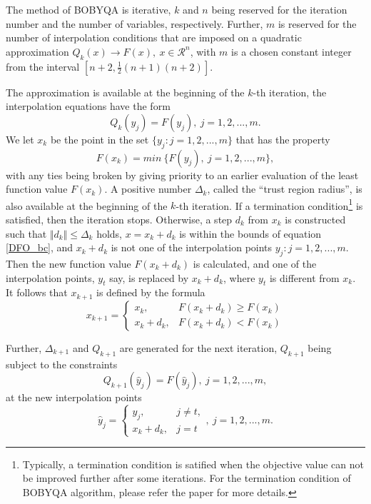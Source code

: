 \documentclass  [
  paper    = a4,
  BCOR     = 10mm,
  twoside,
  fontsize = 12pt,
  fleqn,
  toc      = bibnumbered,
  toc      = listofnumbered,
  numbers  = noendperiod,
  headings = normal,
  listof   = leveldown,
  version  = 3.03
]                                       {scrreprt}
\newcommand{\<}{\langle}
\renewcommand{\>}{\rangle}
\begin{document}
The method of BOBYQA is iterative, $k$ and $n$ being reserved for the iteration number and the number of variables, respectively. Further, $m$ is reserved for the number of interpolation conditions that are imposed on a quadratic approximation $Q_k(x) \xrightarrow{} F(x), \ x \in  \mathcal{R}^n$, with $m$ is a chosen constant  integer from the interval $[n+2, \frac{1}{2}(n+1)(n+2)]$. 

The approximation is available at the beginning of the $k$-th iteration, the interpolation equations have the form
\begin{equation}
	Q_k(y_j)= F(y_j),\   j = 1, 2, ..., m.
\end{equation}
We let $x_k$ be the point in the set $\{y_j : j = 1, 2, ... , m\}$ that has the property
\begin{equation}
	F(x_k)= min\ \{F(y_j), \  j = 1, 2, ..., m\}, 
\end{equation}
with any ties being broken by giving priority to an earlier evaluation of the least function value $F(x_k)$. A positive number $\Delta_k$, called the “trust region radius”, is also available at the beginning of the $k$-th iteration. If a termination condition\footnote{Typically, a termination condition is satified when the objective value can not be improved further after some iterations. For the termination condition of BOBYQA algorithm, please refer the paper \cite{MicPow09} for more details.} is satisfied, then the iteration stops. Otherwise, a step $d_k$ from $x_k$ is constructed such that $ \Vert d_k \Vert \leq \Delta_k $ holds, $x = x_k+d_k$ is within the bounds of equation \ref{DFO_bc}, and $x_k+d_k$ is not one of the interpolation points $y_j : j = 1, 2, ... , m$. Then the new function value $F(x_k+d_k)$ is calculated, and one of the interpolation points, $y_t$ say, is replaced by $x_k+d_k$, where $y_t$ is different from $x_k$. It follows that $x_{k+1}$ is defined by the formula
\begin{equation}
	x_{k+1} =
	\begin{cases}
		x_k, & F(x_k+d_k) \geq F(x_k) \\
		x_k+d_k  , & F(x_k+d_k) < F(x_k) 
	\end{cases}
\end{equation}

Further, $\Delta_{k+1}$ and $Q_{k+1}$ are generated for the next iteration, $Q_{k+1}$ being subject to the constraints 
\begin{equation}
	Q_{k+1}(\hat{y}_j)= F(\hat{y}_j), \  j = 1, 2, ..., m, 
\end{equation}
at the new interpolation points
\begin{equation}
	\hat{y}_j =
	\begin{cases}
		y_j, & j \neq t, \\
		x_k+d_k  , & j =t 
	\end{cases},  \  j = 1, 2, ..., m.
\end{equation}
\end{document}
